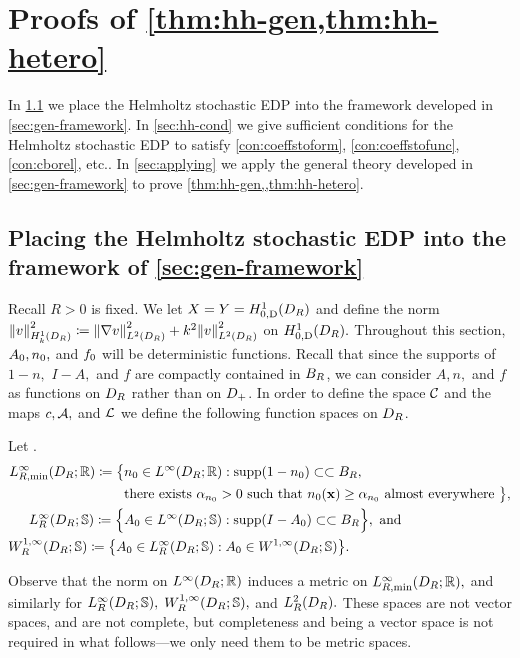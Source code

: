 \section{Proofs of \cref{thm:hh-gen,thm:hh-hetero}}\label{sec:hhproof}
In \cref{sec:placing} we place the Helmholtz stochastic EDP into the framework developed in \cref{sec:gen-framework}. In \cref{sec:hh-cond} we give sufficient conditions for the Helmholtz stochastic EDP to satisfy  \ref{con:coeffstoform}, \ref{con:coeffstofunc}, \ref{con:cborel}, etc.. In \cref{sec:applying} we apply the general theory developed in \cref{sec:gen-framework} to prove \cref{thm:hh-gen,,thm:hh-hetero}.

\subsection{Placing the Helmholtz stochastic EDP into the framework of \cref{sec:gen-framework}}\label{sec:placing}
Recall $R>0$ is fixed. We let $X=Y=\HozDDR$ and define the norm $\NHokDR{v}^2 \de \NLtDR{\grad v}^2 + k^2 \NLtDR{v}^2$ on $\HozDDR.$ Throughout this section, $A_{0},n_{0},$ and $f_{0}$ will be deterministic functions. Recall that since the supports of $1-n,$ $I-A,$ and $f$ are compactly contained in $B_{R}$, we can consider $A, n,$ and $f$ as functions on $D_{R}$ rather than on $D_{+}$. In order to define the space $\mathcal C$ and the maps $c,\mathcal A,$ and $\mathcal L$ we define the following function spaces on $D_{R}$.

\label{def:compsuppspace}
Let
\beqs
\LtRDR \de \set{\fz \in \LtDR \st \supp\mleft(\fz\mright) \compcont \BR}.
\eeqs
\begin{align*}
\LiRminDRRR \de \big\{&\nz \in \LiDRRR \st\supp\mleft(1-\nz\mright) \compcont \BR,\\
&\text{there exists } \alphanz > 0 \text{ such that } \nz(\bx) \geq \alphanz \text{ almost everywhere }\big\},\\
\hspace{-3cm}\LiRminDRRRdtd \de \Big\{&\Az \in \LiDRRRdtd \st \supp\mleft(I-\Az\mright) \compcont \BR\Big\},\text{ and}\\
&\hspace{-3cm}\WoiRminDRRRdtd \de \set{\Az \in \LiRminDRRRdtd \st\Az \in \WoiDRRRdtd}.
\end{align*}
\ede

Observe that the norm on $\LiDRRR$ induces a metric on $\LiRminDRRR,$ and similarly for $\LiRDRRRdtd,$ $\WoiRminDRRRdtd,$ and $\LtRDR.$ These spaces are not vector spaces, and are not complete, but completeness and being a vector space is not required in what follows---we only need them to be metric spaces.


